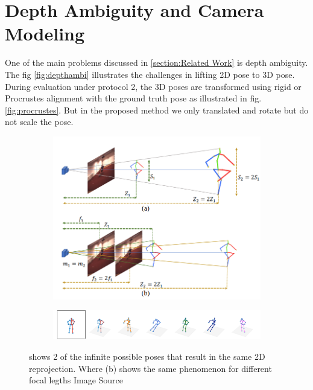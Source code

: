 \section{Depth Ambiguity and Camera Modeling}
\label{depth_ambiguity_camera_modeling}

One of the main problems discussed in \ref{section:Related Work} is depth ambiguity. The fig \ref{fig:depthambi} illustrates the challenges in lifting 2D pose to 3D pose. During evaluation under protocol 2, the 3D poses are transformed using rigid or Procrustes alignment with the ground truth pose as illustrated in fig. \ref{fig:procrustes}. But in the proposed method we only translated and rotate but do not scale the pose.





\begin{figure}[h]
    \centering
    \begin{subfigure}[b]{0.6\textwidth}
        \centering
        \includegraphics[width=\textwidth]{figures/background/depthambi.png}
        
    \end{subfigure}

    \begin{subfigure}[b]{\textwidth}
        \centering
        \includegraphics[width=\textwidth]{figures/h36_viz/multiple3d_per_2d.pdf}

    \end{subfigure}

    \caption{shows 2 of the infinite possible poses that result in the same 2D reprojection. Where (b) shows the same phenomenon for different focal legths
    Image Source \cite{poselifter}}
    \label{fig:depth_ambiguity_cases}
\end{figure}




